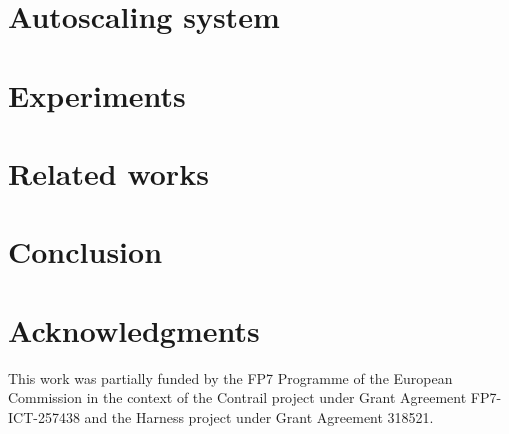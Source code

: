 \documentclass{sig-alternate-10pt}
\begin{document}
%


%


\section{Autoscaling system}




\section{Experiments \label{sec:experiments}}



\section{Related works \label{sec:relatedWorks}}



\section{Conclusion \label{sec:conclusion}}



\section{Acknowledgments}

This work was partially funded by the FP7 Programme of the European
Commission in the context of the Contrail project under Grant
Agreement FP7-ICT-257438 and the Harness project under Grant Agreement
318521.

\balancecolumns



\end{document}
